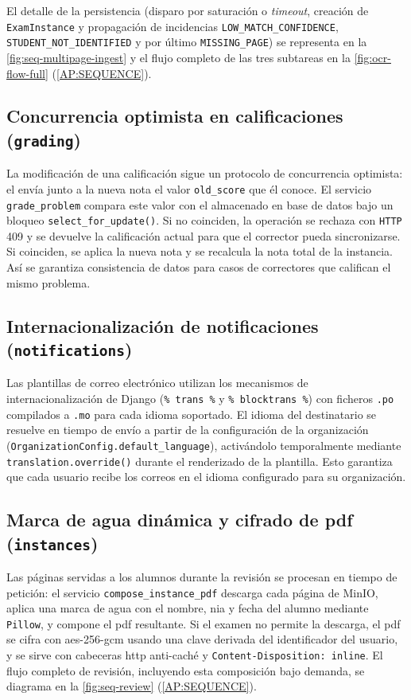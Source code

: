 El detalle de la persistencia (disparo por saturación o
\textit{timeout}, creación de \texttt{ExamInstance} y propagación de
incidencias \texttt{LOW\_MATCH\_CONFIDENCE}, \texttt{STUDENT\_NOT\_IDENTIFIED}
y por último \texttt{MISSING\_PAGE}) se representa en la
\cref{fig:seq-multipage-ingest} y el flujo completo de las tres
subtareas en la \cref{fig:ocr-flow-full} (\cref{AP:SEQUENCE}).


\subsection{Concurrencia optimista en calificaciones (\texttt{grading})}

La modificación de una calificación sigue un protocolo de
concurrencia optimista: el  envía junto a la nueva
nota el valor \texttt{old\_score} que él conoce. El servicio
\texttt{grade\_problem} compara este valor con el almacenado en base
de datos bajo un bloqueo \texttt{select\_for\_update()}. Si no
coinciden, la operación se rechaza con \texttt{HTTP}\,409 y se
devuelve la calificación actual para que el corrector pueda
sincronizarse. Si coinciden, se aplica la nueva nota y se recalcula
la nota total de la instancia. Así se garantiza consistencia de datos
para casos de correctores que califican el mismo problema.


\subsection{Internacionalización de notificaciones (\texttt{notifications})}

Las plantillas de correo electrónico utilizan los mecanismos de
internacionalización de Django (\texttt{\%\ trans\ \%} y
\texttt{\%\ blocktrans\ \%}) con ficheros \texttt{.po} compilados a
\texttt{.mo} para cada idioma soportado. El idioma del destinatario se
resuelve en tiempo de envío a partir de la configuración de la
organización (\texttt{OrganizationConfig.default\_language}),
activándolo temporalmente mediante \texttt{translation.override()}
durante el renderizado de la plantilla. Esto garantiza que cada
usuario recibe los correos en el idioma configurado para su
organización.


\subsection{Marca de agua dinámica y cifrado de \acs{pdf} (\texttt{instances})}

Las páginas servidas a los alumnos durante la revisión se procesan en
tiempo de petición: el servicio \texttt{compose\_instance\_pdf}
descarga cada página de MinIO, aplica una marca de agua con el
nombre, \acs{nia} y fecha del alumno mediante \texttt{Pillow}, y
compone el \acs{pdf} resultante. Si el examen no permite la descarga,
el \acs{pdf} se cifra con \acs{aes}-256-\acs{gcm} usando una clave
derivada del identificador del usuario, y se sirve con cabeceras
\acs{http} anti-caché y \texttt{Content-Disposition: inline}.
El flujo completo de revisión, incluyendo esta composición bajo demanda,
se diagrama en la \cref{fig:seq-review} (\cref{AP:SEQUENCE}).


